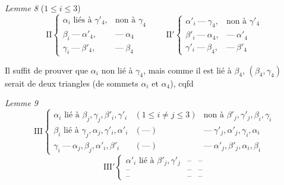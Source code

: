 \documentclass[11pt,a4paper]{article}
\begin{document}
\emph{Lemme 8} ($1 \leqslant i \leqslant 3$)
\[
\mathrm{II} \left\lbrace
\begin{array}{lll}
\alpha_i \text{ liés à } \gamma'_4, & \text{non à } \gamma_4 \\
\beta_i \ \text{---} \ \alpha'_4, & \text{---} \ \alpha_4 \\
\gamma_i \ \text{---} \ \beta'_4, & \text{---} \ \beta_4
\end{array}
\right.
\qquad
\mathrm{II}' \left\lbrace
\begin{array}{lll}
\alpha'_i \ \text{---} \ \gamma_4, & \text{non à } \gamma'_4 \\
\beta'_i \ \text{---} \ \alpha_4, & \text{---} \ \alpha'_4 \\
\gamma'_i \ \text{---} \ \beta_4, & \text{---} \ \beta'_4
\end{array}
\right.
\]


Il suffit de prouver que $\alpha_i$ non lié à $\gamma_4$, mais comme il est lié
à $\beta_4$, $(\beta_4, \gamma_4)$ serait \struck{\ill{}}  de deux
triangles (de sommets $\alpha_i$ et $\alpha_4$), cqfd

\emph{Lemme 9}
\[
\mathrm{III} \left\lbrace
\begin{array}{lll}
\alpha_i \text{ lié à } \beta_j, \gamma_j, \beta'_i, \gamma'_i & (1
\leqslant i \neq j \leqslant 3) & \text{non à } \beta'_j, \gamma'_j, \beta_i,
\gamma_i \\
\beta_i \text{ lié à } \gamma_j, \alpha_j, \gamma'_i, \alpha'_i & (\text{---})
& \text{---} \ \gamma'_j, \alpha'_j, \gamma_i, \alpha_i \\
\gamma_i \ \text{---} \ \alpha_j, \beta_j, \alpha'_i, \beta'_i & (\text{---}) &
\text{---} \ \alpha'_j, \beta'_j, \alpha_i, \beta_i
\end{array}
\right.
\]
\[
\mathrm{III}' \left\lbrace
\begin{array}{lll}
\alpha'_i \text{ lié à } \beta'_j, \gamma'_j & \text{--} & \text{--} \\
\text{--} & \text{--} & \text{--} \\
\text{--} & \text{--} & \text{--}
\end{array}
\right.
\]
\end{document}
